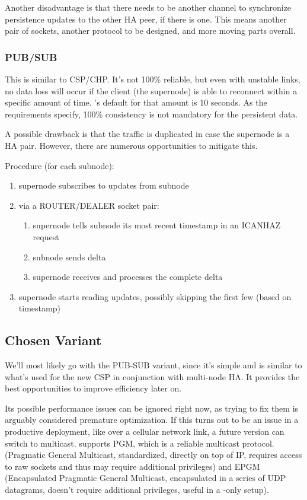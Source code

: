 Another disadvantage is that there needs to be another channel to synchronize
persistence updates to the other HA peer, if there is one. This means another
pair of sockets, another protocol to be designed, and more moving parts
overall.

\subsubsection{PUB/SUB}
This is similar to \gls{CSP}/\gls{CHP}. It's not 100\% reliable, but even with unstable
links, no data loss will occur if the client (the supernode) is able to reconnect within a
specific amount of time. \zmq's default for that amount is 10 seconds. As the
requirements specify, 100\% consistency is not mandatory for the persistent
data.

A possible drawback is that the traffic is duplicated in case the supernode
is a HA pair. However, there are numerous opportunities to mitigate this.

Procedure (for each subnode):
\begin{enumerate}
	\item supernode subscribes to updates from subnode
	\item via a ROUTER/DEALER socket pair:
		\begin{enumerate}
			\item supernode tells subnode its most recent timestamp in an ICANHAZ request
			\item subnode sends delta
			\item supernode receives and processes the complete delta
		\end{enumerate}
	\item supernode starts reading updates, possibly skipping the first few (based on timestamp)
\end{enumerate}


\subsection{Chosen Variant}
We'll most likely go with the PUB-SUB variant, since it's simple and is similar to
what's used for the new \gls{CSP} in conjunction with multi-node \gls{HA}. It provides the best
opportunities to improve efficiency later on.

Its possible performance issues can be ignored right now, as trying to fix them
is arguably considered premature optimization. If this turns out to be an issue
in a productive deployment, like over a cellular network link, a future version
can switch to multicast. \zmq supports PGM, which is a reliable multicast
protocol. (Pragmatic General Multicast, standardized, directly on top of IP,
requires access to raw sockets and thus may require additional privileges) and
EPGM (Encapsulated Pragmatic General Multicast, encapsulated in a series of UDP
datagrams, doesn't require additional privileges, useful in a \zmq-only setup).

